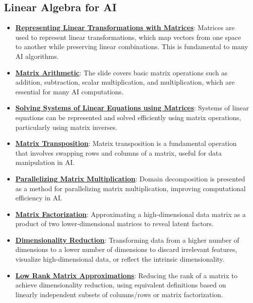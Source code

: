 \documentclass{article}%
\begin{document}
%
\subsection{Linear Algebra for AI}%
\label{subsec:LinearAlgebraforAI}%
\begin{itemize}[leftmargin=*]%
\item \href{https://www.math.purdue.edu/~yipn/351/04L1-Linear Algebra Primer.pdf#page=5}{\textbf{Representing Linear Transformations with Matrices}}: Matrices are used to represent linear transformations, which map vectors from one space to another while preserving linear combinations. This is fundamental to many AI algorithms.%
\item \href{https://www.math.purdue.edu/~yipn/351/04L1-Linear Algebra Primer.pdf#page=9}{\textbf{Matrix Arithmetic}}: The slide covers basic matrix operations such as addition, subtraction, scalar multiplication, and multiplication, which are essential for many AI computations.%
\item \href{https://www.math.purdue.edu/~yipn/351/04L1-Linear Algebra Primer.pdf#page=11}{\textbf{Solving Systems of Linear Equations using Matrices}}: Systems of linear equations can be represented and solved efficiently using matrix operations, particularly using matrix inverses.%
\item \href{https://www.math.purdue.edu/~yipn/351/04L1-Linear Algebra Primer.pdf#page=16}{\textbf{Matrix Transposition}}: Matrix transposition is a fundamental operation that involves swapping rows and columns of a matrix, useful for data manipulation in AI.%
\item \href{https://www.math.purdue.edu/~yipn/351/04L1-Linear Algebra Primer.pdf#page=18}{\textbf{Parallelizing Matrix Multiplication}}: Domain decomposition is presented as a method for parallelizing matrix multiplication, improving computational efficiency in AI.%
\item \href{https://www.math.purdue.edu/~yipn/351/11L2-svd-pca-recommender.pdf#page=13}{\textbf{Matrix Factorization}}: Approximating a high-dimensional data matrix as a product of two lower-dimensional matrices to reveal latent factors.%
\item \href{https://www.math.purdue.edu/~yipn/351/11L2-svd-pca-recommender.pdf#page=8}{\textbf{Dimensionality Reduction}}: Transforming data from a higher number of dimensions to a lower number of dimensions to discard irrelevant features, visualize high-dimensional data, or reflect the intrinsic dimensionality.%
\item \href{https://www.math.purdue.edu/~yipn/351/11L2-svd-pca-recommender.pdf#page=9}{\textbf{Low Rank Matrix Approximations}}: Reducing the rank of a matrix to achieve dimensionality reduction, using equivalent definitions based on linearly independent subsets of columns/rows or matrix factorization.%
\end{itemize}
\end{document}
